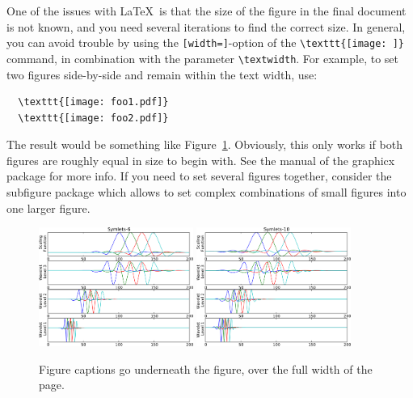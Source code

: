 \documentclass[12pt]{article}
\begin{document}
One of the issues with \LaTeX\ is that the size of the figure in the final document is not known, and you need several iterations to find the correct size. In general, you can avoid trouble by using the \texttt{[width=]}-option of the \verb|\texttt{[image: ]}| command, in combination with the parameter \verb|\textwidth|. For example, to set two figures side-by-side and remain within the text width, use: 

\begin{verbatim}
  \texttt{[image: foo1.pdf]}
  \texttt{[image: foo2.pdf]}
\end{verbatim}

The result would be something like Figure~\ref{fig::sym6}. Obviously, this only works if both figures are roughly equal in size to begin with. See the manual of the graphicx package for more info. If you need to set several figures together, consider the subfigure package which allows to set complex combinations of small figures into one larger figure. 

\begin{figure}[ht!]
  \begin{center}
    \includegraphics[width=0.45\textwidth]{sym6-crop.pdf}
    \includegraphics[width=0.45\textwidth]{sym10-crop.pdf}
    \caption[]{\label{fig::sym6}Figure captions go underneath the figure, over the full width of the page.}%
  \end{center}
\end{figure}
\end{document}
